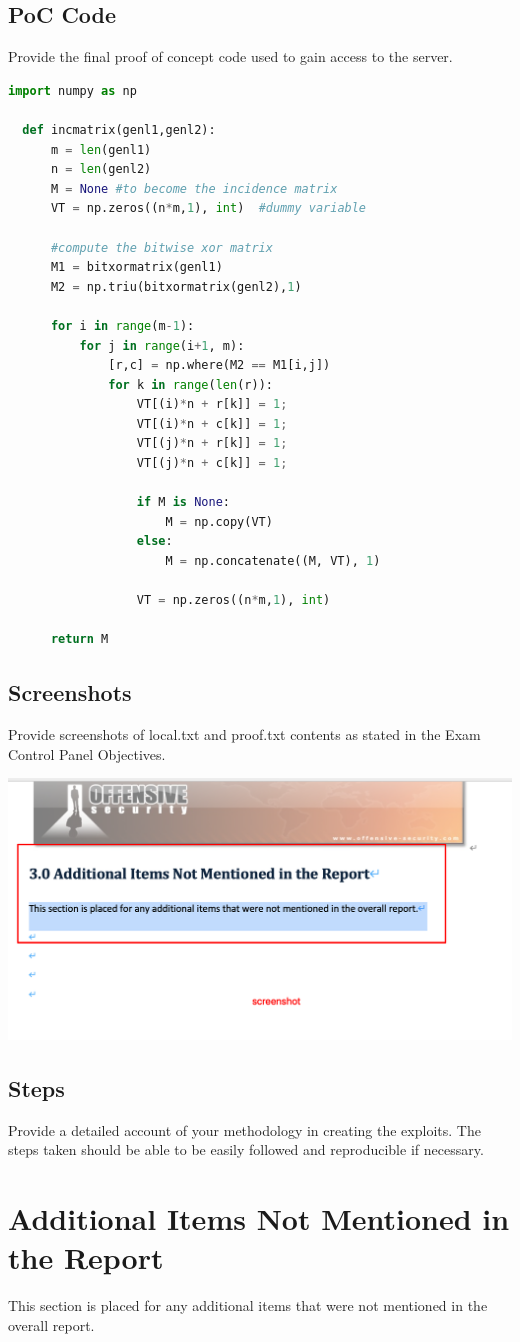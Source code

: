 \documentclass[a4paper]{article}
\begin{document}
\subsection{PoC Code}
Provide the final proof of concept code used to gain access to the server.

\begin{lstlisting}[language=Python]
  import numpy as np
      
  def incmatrix(genl1,genl2):
      m = len(genl1)
      n = len(genl2)
      M = None #to become the incidence matrix
      VT = np.zeros((n*m,1), int)  #dummy variable
      
      #compute the bitwise xor matrix
      M1 = bitxormatrix(genl1)
      M2 = np.triu(bitxormatrix(genl2),1) 
  
      for i in range(m-1):
          for j in range(i+1, m):
              [r,c] = np.where(M2 == M1[i,j])
              for k in range(len(r)):
                  VT[(i)*n + r[k]] = 1;
                  VT[(i)*n + c[k]] = 1;
                  VT[(j)*n + r[k]] = 1;
                  VT[(j)*n + c[k]] = 1;
                  
                  if M is None:
                      M = np.copy(VT)
                  else:
                      M = np.concatenate((M, VT), 1)
                  
                  VT = np.zeros((n*m,1), int)
      
      return M
  \end{lstlisting}

\subsection{Screenshots}
Provide screenshots of local.txt and proof.txt contents as stated in the Exam Control Panel Objectives.

\includegraphics[]{screenshot.png}

\subsection{Steps}
Provide a detailed account of your methodology in creating the exploits. The steps taken should be able to be easily followed and reproducible if necessary.

\section{Additional Items Not Mentioned in the Report}
This section is placed for any additional items that were not mentioned in the overall report.
\end{document}
